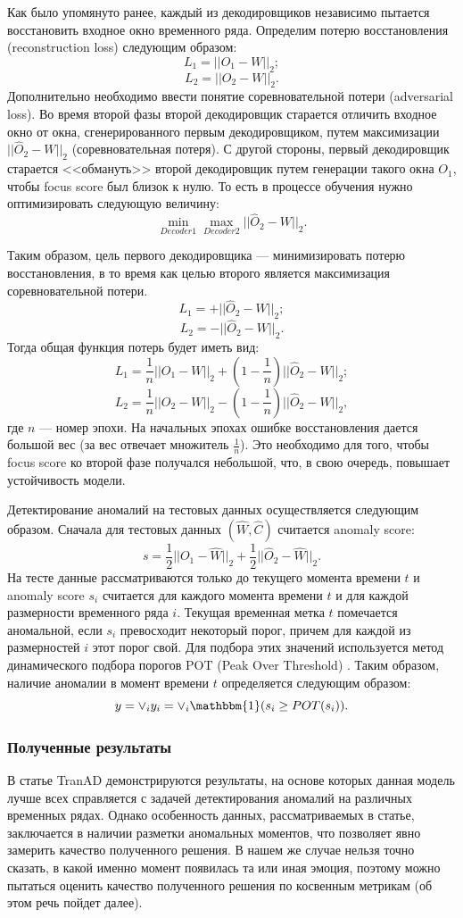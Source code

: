 \documentclass{article}
\begin{document}
Как было упомянуто ранее, каждый из декодировщиков независимо пытается восстановить входное окно временного ряда. Определим потерю восстановления (reconstruction loss) следующим образом: 
$$
L_1 = ||O_1 - W||_2;
$$
$$
L_2 = ||O_2 - W||_2.
$$
Дополнительно необходимо ввести понятие соревновательной потери (adversarial loss). Во время второй фазы второй декодировщик старается отличить входное окно от окна, сгенерированного первым декодировщиком, путем максимизации $||\hat{O}_2 - W||_2$ (соревновательная потеря). С другой стороны, первый декодировщик старается <<обмануть>> второй декодировщик путем генерации такого окна $O_1$, чтобы focus score был близок к нулю. То есть в процессе обучения нужно оптимизировать следующую величину: 
$$
\min_{Decoder1} \max_{Decoder2} ||\hat{O}_2 - W||_2.
$$

Таким образом, цель первого декодировщика --- минимизировать потерю восстановления, в то время как целью второго является максимизация соревновательной потери. 
$$
L_1 = +||\hat{O}_2 - W||_2;
$$
$$
L_2 = -||\hat{O}_2 - W||_2.
$$
Тогда общая функция потерь будет иметь вид:
$$
L_1 = \frac{1}{n}||O_1 - W||_2 + (1 - \frac{1}{n})||\hat{O}_2 - W||_2;
$$
$$
L_2 = \frac{1}{n}||O_2 - W||_2 - (1 - \frac{1}{n})||\hat{O}_2 - W||_2,
$$
где $n$ --- номер эпохи. На начальных эпохах ошибке восстановления дается большой вес (за вес отвечает множитель $\frac{1}{n}$). Это необходимо для того, чтобы focus score ко второй фазе получался небольшой, что, в свою очередь, повышает устойчивость модели.



Детектирование аномалий на тестовых данных осуществляется следующим образом. Сначала для тестовых данных $(\hat{W}, \hat{C})$ считается anomaly score: 
$$
s = \frac{1}{2}||O_1 - \hat{W}||_2 + \frac{1}{2}||\hat{O}_2 - \hat{W}||_2.
$$
На тесте данные рассматриваются только до текущего момента времени $t$ и anomaly score $s_i$ считается для каждого момента времени $t$ и для каждой размерности временного ряда $i$. Текущая временная метка $t$ помечается аномальной, если $s_i$ превосходит некоторый порог, причем для каждой из размерностей $i$ этот порог свой. Для подбора этих значений используется метод динамического подбора порогов POT (Peak Over Threshold) \cite{POT}. Таким образом, наличие аномалии в момент времени $t$ определяется следующим образом: 
$$
y = \lor_{i} y_i = \lor_{i} \mathbbm{1}(s_i \geq POT(s_i)). 
$$

\subsubsection{Полученные результаты}
В статье TranAD \citep{tranad} демонстрируются результаты, на основе которых данная модель лучше всех справляется с задачей детектирования аномалий на различных временных рядах. Однако особенность данных, рассматриваемых в статье, заключается в наличии разметки аномальных моментов, что позволяет явно замерить качество полученного решения. В нашем же случае нельзя точно сказать, в какой именно момент появилась та или иная эмоция, поэтому можно пытаться оценить качество полученного решения по косвенным метрикам (об этом речь пойдет далее).
\end{document}
